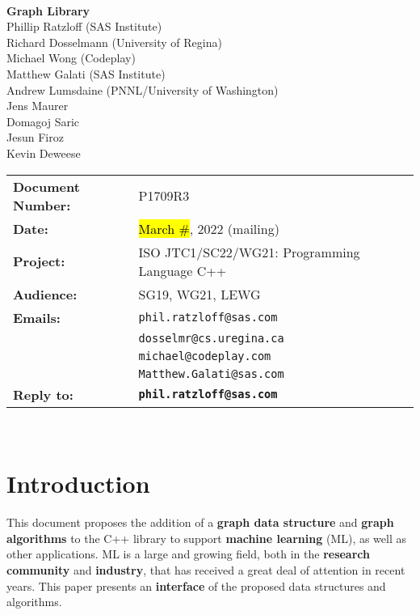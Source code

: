 \documentclass[10pt,onecolumn]{article}
\begin{document}
\begin{titlepage}
~
\vfill
\begin{center}
\LARGE
\textbf{Graph Library}\\
\vspace{12pt}
\normalsize
	Phillip Ratzloff (SAS Institute)\\
	Richard Dosselmann (University of Regina)\\
	Michael Wong (Codeplay)\\
	Matthew Galati (SAS Institute)\\	
	Andrew Lumsdaine (PNNL/University of Washington)\\
	Jens Maurer\\
	Domagoj Saric\\
	Jesun Firoz\\
	Kevin Deweese\\
\end{center}
\vspace{32pt}
\begin{tabular}{ll}
\textbf{Document Number:} & P1709R3\\
\textbf{Date:} & \hl{March \#}, 2022 (mailing)\\ 
\textbf{Project:} & ISO JTC1/SC22/WG21: Programming Language C++\\
\textbf{Audience:} & SG19, WG21, LEWG\\
\textbf{Emails:}
	&\texttt{phil.ratzloff@sas.com}\\
	&\texttt{dosselmr@cs.uregina.ca}\\
	&\texttt{michael@codeplay.com}\\
	&\texttt{Matthew.Galati@sas.com}\\
\textbf{Reply to:}
	&\texttt{\textbf{phil.ratzloff@sas.com}}\\
\end{tabular}
\vfill
~
\end{titlepage}

\tableofcontents

\clearpage

\section{Introduction}
This document proposes the addition of a \textbf{graph data structure} and \textbf{graph algorithms} to the C++ library to support \textbf{machine learning} (ML), as well as other applications. ML is a large and growing field, both in the \textbf{research community} and \textbf{industry}, that has received a great deal of attention in recent years. This paper presents an \textbf{interface} of the proposed data structures and algorithms.
\end{document}
